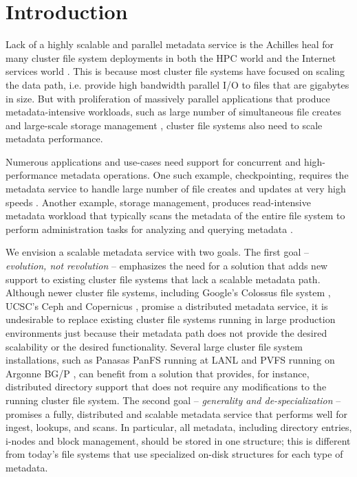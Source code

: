 \section{Introduction}

Lack of a highly scalable and parallel metadata service is the 
Achilles heal for many cluster file system deployments in both the HPC world 
\cite{hecfsio:tr06, hpcs-io:2008} and the Internet services world \cite{HDFS}.
This is because most cluster file systems have focused on scaling the
data path, i.e. provide high bandwidth parallel I/O to files that are 
gigabytes in size.
But with proliferation of massively parallel applications that produce 
metadata-intensive workloads, such as large number of simultaneous file creates
\cite{PLFS} and large-scale storage management \cite{issdm}, cluster file systems 
also need to scale metadata performance.

Numerous applications and use-cases need support for concurrent and 
high-performance metadata operations.
One such example, checkpointing, requires the metadata service to
handle large number of file creates and updates at very high speeds 
\cite{PLFS}.
Another example, storage management, produces read-intensive metadata workload
that typically scans the metadata of the entire file system to perform
administration tasks for analyzing and querying metadata \cite{filemgmt-ucsc, magellan-ucsc}.

We envision a scalable metadata service with two goals. 
The first goal -- \textit{evolution, not revolution} -- emphasizes the need for
a solution that adds new support to existing cluster file systems that lack a 
scalable metadata path.
Although newer cluster file systems, including Google's Colossus file system 
\cite{50mfiles-in-googlefs:fikes10}, UCSC's Ceph \cite{ceph:weil06} and 
Copernicus \cite{sfs-ucsc}, promise a distributed metadata 
service, it is 
undesirable to replace existing cluster file systems running in large production
environments just because their metadata path does not provide the desired
scalability or the desired functionality.
Several large cluster file system installations, such as Panasas PanFS running
at LANL \cite{panfs:welch08} and PVFS running on Argonne BG/P 
\cite{pvfs:www,bgp}, can 
benefit from a solution that provides, for instance, distributed directory support 
that does not require any modifications to the running cluster file system.
The second goal -- \textit{generality and de-specialization} -- promises a 
fully, distributed and
scalable metadata service that performs well for ingest, lookups, and scans.
In particular, all metadata, including directory entries, i-nodes and block
management, should be stored in one structure; this is different from
today's file systems that use specialized on-disk structures for each type of 
metadata.

